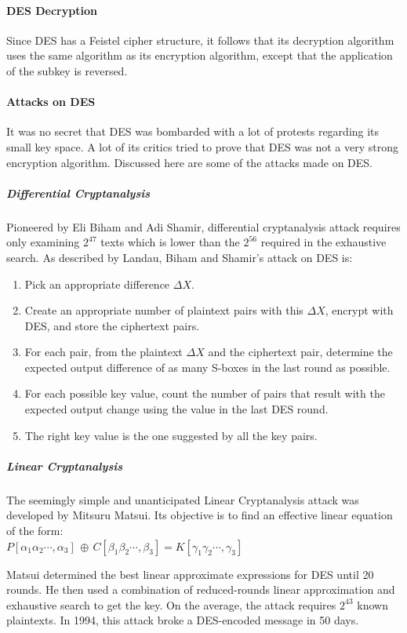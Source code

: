 \documentclass{article}
\begin{document}
\paragraph{DES Decryption}
Since DES has a Feistel cipher structure, it follows that its decryption algorithm uses the same algorithm as its encryption algorithm, except that the application of the subkey is reversed.\cite{stallings2011}

\paragraph{Attacks on DES}
It was no secret that DES was bombarded with a lot of protests regarding its small key space. A lot of its critics tried to prove that DES was not a very strong encryption algorithm. Discussed here are some of the attacks made on DES.

\subparagraph{Differential Cryptanalysis}
Pioneered by Eli Biham and Adi Shamir, differential cryptanalysis attack requires only examining $2^{47}$ texts which is lower than the $2^{56}$ required in the exhaustive search. As described by Landau\cite{landau2000}, Biham and Shamir's attack on DES is:

\begin{enumerate}
\item Pick an appropriate difference $\Delta X$.
\item Create an appropriate number of plaintext pairs with this $\Delta X$, encrypt with DES, and store the ciphertext pairs.
\item For each pair, from the plaintext $\Delta X$ and the ciphertext pair, determine the expected output difference of as many S-boxes in the last round as possible.
\item For each possible key value, count the number of pairs that result with the expected output change using the value in the last DES round.
\item The right key value is the one suggested by all the key pairs.
\end{enumerate}

\subparagraph{Linear Cryptanalysis}
The seemingly simple and unanticipated Linear Cryptanalysis attack was developed by Mitsuru Matsui. Its objective is to find an effective linear equation of the form\cite{landau2000}:\\
$P[\alpha_{1}\alpha_{2}\cdots,\alpha_{3}] \, \oplus \, C[\beta_{1}\beta_{2}\cdots,\beta_{3}] = K[\gamma_{1}\gamma_{2}\cdots,\gamma_{3}]$

Matsui determined the best linear approximate expressions for DES until 20 rounds. He then used a combination of reduced-rounds linear approximation and exhaustive search to get the key. On the average, the attack requires $2^{43}$ known plaintexts. In 1994, this attack broke a DES-encoded message in 50 days.\cite{stallings2011}
\end{document}
